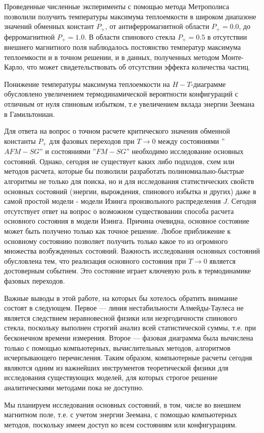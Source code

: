 Проведенные численные эксперименты с помощью метода Метрополиса позволили получить температуры максимума теплоемкости в широком диапазоне значений обменных констант $P_+$, от антиферромагнитной области $P_+=0.0$, до ферромагнитной $P_+=1.0$. В области спинового стекла $P_+=0.5$ в отсутствии внешнего магнитного поля наблюдалось постоянство температур максимума теплоемкости и в точном решении, и в данных, полученных методом Монте-Карло, что может свидетельствовать об отсутствии эффекта количества частиц.

Понижение температуры максимума теплоемкости на $H-T$-диаграмме обусловлено увеличением термодинамической вероятности конфигураций с отличным от нуля спиновым избытком, т.е увеличением вклада энергии Зеемана в Гамильтониан.

Для ответа на вопрос о точном расчете критического значения обменной константы $P_+$ для фазовых переходов при $T\rightarrow0$ между состояниями ''$AFM-SG$'' и состояниями ''$FM-SG$'' необходимо исследование основных состояний. Однако, сегодня не существует каких либо подходов, схем или методов расчета, которые бы позволили разработать полиномиально-быстрые алгоритмы не только для поиска, но и для исследования статистических свойств основных состояний (энергии, вырождения, спинового избытка и других) даже в самой простой модели - модели Изинга произвольного распределения $J$. Сегодня отсутствует ответ на вопрос о возможном существовании способа расчета основного состояния в модели Изинга. Причина очевидна, основное состояние может быть получено только как точное решение. Любое приближение к основному состоянию позволяет получить только какое то из огромного множества возбужденных состояний. Важность исследования основных состояний обусловлена тем, что реализация основного состояния при $T\rightarrow0$ является достоверным событием.  Это состояние играет ключевую роль в термодинамике фазовых переходов.

Важные выводы в этой работе, на которых бы хотелось обратить внимание состоят в следующем. Первое --- линия нестабильности Алмейды-Таулеса не является следствием неравновесной физики или неэргодичности спинового стекла, поскольку выполнен строгий анализ всей статистической суммы, т.е. при бесконечном времени измерения.  Второе --- фазовая диаграмма была вычислена только с помощью компьютерных, вычислительных методов, алгоритмов исчерпывающего перечисления. Таким образом, компьютерные расчеты сегодня являются одним из важнейших инструментов теоретической физики для исследования существующих моделей, для которых строгое решение аналитическими методами пока не доступно.

Мы планируем исследования основных состояний, в том, числе во внешнем магнитном поле, т.е. с учетом энергии Зеемана, с помощью компьютерных методов, поскольку имеем доступ ко всем состояниям или конфигурациям.
